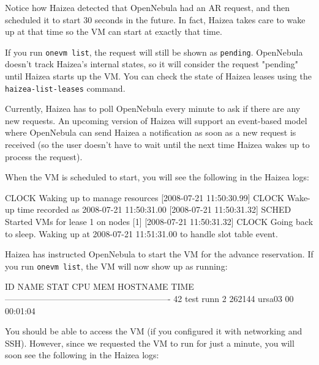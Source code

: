 Notice how Haizea detected that OpenNebula had an AR request, and then scheduled it to start 30 seconds in the future. In fact, Haizea takes care to wake up at that time so the VM can start at exactly that time.

\begin{warning}
If you run \texttt{onevm list}, the request will still be shown as \texttt{pending}. OpenNebula doesn't track Haizea's internal states, so it will consider the request "pending" until Haizea starts up the VM. You can check the state of Haizea leases using the \texttt{haizea-list-leases} command.
\end{warning}

\begin{warning}
Currently, Haizea has to poll OpenNebula every minute to ask if there are any new requests. An upcoming version of Haizea will support an event-based model where OpenNebula can send Haizea a notification as soon as a new request is received (so the user doesn't have to wait until the next time Haizea wakes up to process the request).
\end{warning}

When the VM is scheduled to start, you will see the following in the Haizea logs:

\begin{wideshellverbatim}
[2008-07-21 11:50:30.99] CLOCK   Waking up to manage resources
[2008-07-21 11:50:30.99] CLOCK   Wake-up time recorded as 2008-07-21 11:50:31.00
[2008-07-21 11:50:31.32] SCHED   Started VMs for lease 1 on nodes [1]
[2008-07-21 11:50:31.32] CLOCK   Going back to sleep. 
                                 Waking up at 2008-07-21 11:51:31.00 
                                 to handle slot table event.
\end{wideshellverbatim}

Haizea has instructed OpenNebula to start the VM for the advance reservation. If you run \texttt{onevm list}, the VM will now show up as running:

\begin{wideshellverbatim}
  ID     NAME STAT CPU     MEM        HOSTNAME        TIME
----------------------------------------------------------
  42     test runn   2  262144          ursa03 00 00:01:04
\end{wideshellverbatim}

You should be able to access the VM (if you configured it with networking and SSH). However, since we requested the VM to run for just a minute, you will soon see the following in the Haizea logs:

